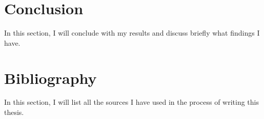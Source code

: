 \documentclass{article}
\begin{document}
\section{Conclusion}
In this section, I will conclude with my results and discuss briefly what findings I have.

\section{Bibliography}
In this section, I will list all the sources I have used in the process of writing this thesis.
\end{document}
